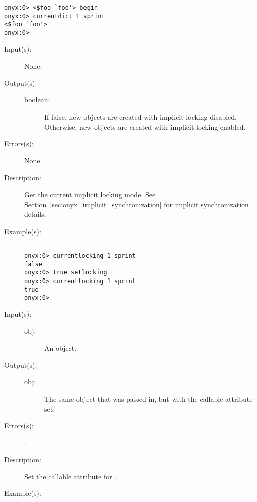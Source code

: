 \begin{description}
\begin{description}
\begin{verbatim}
onyx:0> <$foo `foo'> begin
onyx:0> currentdict 1 sprint
<$foo `foo'>
onyx:0>
		\end{verbatim}
	\end{description}
\label{systemdict:currentlocking}
\item[{\onyxop{--}{currentlocking}{boolean}}: ]
	\begin{description}\item[]
	\item[Input(s): ] None.
	\item[Output(s): ]
		\begin{description}\item[]
		\item[boolean: ]
			If false, new objects are created with implicit locking
			disabled.  Otherwise, new objects are created with
			implicit locking enabled.
		\end{description}
	\item[Errors(s): ] None.
	\item[Description: ]
		Get the current implicit locking mode.  See
		Section~\ref{sec:onyx_implicit_synchronization} for implicit
		synchronization details.
	\item[Example(s): ]\begin{verbatim}

onyx:0> currentlocking 1 sprint
false
onyx:0> true setlocking
onyx:0> currentlocking 1 sprint
true
onyx:0>
		\end{verbatim}
	\end{description}
\label{systemdict:cvc}
\item[{\onyxop{obj}{cvc}{obj}}: ]
	\begin{description}\item[]
	\item[Input(s): ]
		\begin{description}\item[]
		\item[obj: ]
			An object.
		\end{description}
	\item[Output(s): ]
		\begin{description}\item[]
		\item[obj: ]
			The same object that was passed in, but with the
			callable attribute set.
		\end{description}
	\item[Errors(s): ]
		\begin{description}\item[]
		\item[.]
		\end{description}
	\item[Description: ]
		Set the callable attribute for .
	\item[Example(s): ]\begin{verbatim}


\end{verbatim}
\end{description}
\end{description}
